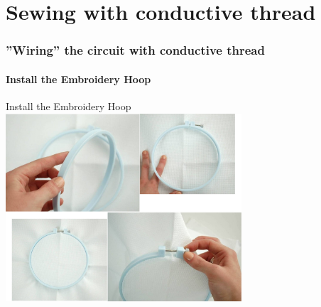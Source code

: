 \documentclass[aspectratio=169]{beamer}
\begin{document}
\part{Sewing with conductive thread}
\section{''Wiring'' the circuit with conductive thread}
\frame{\tableofcontents[hideothersubsections,sectionstyle=show/hide]}
\subsection{Install the Embroidery Hoop}
\begin{frame}[fragile]{Install the Embroidery Hoop}
\includegraphics[height=2.75in]{InstallEmbroideryHoop.jpg}
\end{frame} 
\end{document}
